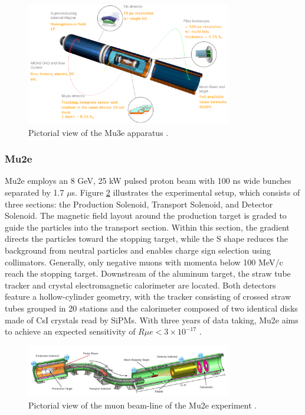 \begin{refsection}
        \begin{figure}[h!]
            \centering
            \includegraphics[width=0.8\textwidth]{Figures/Introduction/Mu3e_3D.png}
            \caption[Mu3e experiment]{Pictorial view of the Mu3e apparatus \cite{Papa}.}
        \label{_Mu3e_3D}
        \end{figure}

        \subsubsection{Mu2e}
        Mu2e employs an 8 GeV, 25 kW pulsed proton beam with 100 ns wide bunches separated by 1.7 $\mu$s. 
        Figure \ref{Mu2e} illustrates the experimental setup, which consists of three sections: the Production Solenoid, Transport Solenoid, and Detector Solenoid. The magnetic field layout around the production target is graded to guide the particles into the transport section. 
        Within this section, the gradient directs the particles toward the stopping target, while the S shape reduces the background from neutral particles and enables charge sign selection using collimators. 
        Generally, only negative muons with momenta below 100 MeV/c reach the stopping target. 
        Downstream of the aluminum target, the straw tube tracker and crystal electromagnetic calorimeter are located. Both detectors feature a hollow-cylinder geometry, with the tracker consisting of crossed straw tubes grouped in 20 stations and the calorimeter composed of two identical disks made of CsI crystals read by SiPMs. 
        With three years of data taking, Mu2e aims to achieve an expected sensitivity of $R{\mu e}<3\times10^{-17}$ \cite{MTDR}.

        \begin{figure}[h!]
            \centering
            \includegraphics[width=0.8\textwidth]{Figures/Introduction/mu2e_apparatus.jpg}
            \caption[Mu2e experiment]{Pictorial view of the muon beam-line of the Mu2e experiment \cite{MTDR}.}
        \label{Mu2e}
        \end{figure}
        

\end{refsection}
